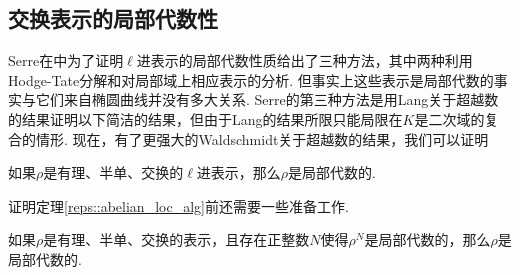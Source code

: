 \subsection{交换表示的局部代数性}

Serre在\parencite{serre1997abelian}中为了证明$\ell$进表示的局部代数性质给出了三种方法，其中两种利用Hodge-Tate分解和对局部域上相应表示的分析. 但事实上这些表示是局部代数的事实与它们来自椭圆曲线并没有多大关系. Serre的第三种方法是用Lang关于超越数的结果证明以下简洁的结果，但由于Lang的结果所限只能局限在$K$是二次域的复合的情形. 现在，有了更强大的Waldschmidt关于超越数的结果，我们可以证明

\begin{cthm}
    如果$\rho$是有理、半单、交换的$\ell$进表示，那么$\rho$是局部代数的. \label{reps::abelian_loc_alg}
\end{cthm}

证明定理\ref{reps::abelian_loc_alg}前还需要一些准备工作.

\begin{cprop}
    如果$\rho$是有理、半单、交换的表示，且存在正整数$N$使得$\rho^N$是局部代数的，那么$\rho$是局部代数的.
\end{cprop}

